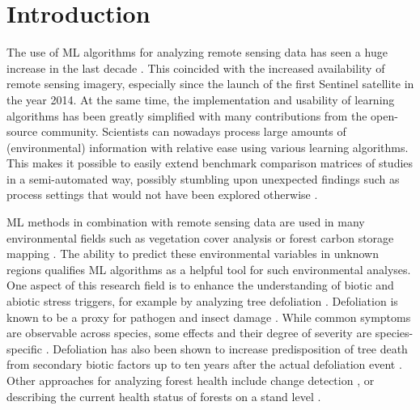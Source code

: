 \documentclass[remotesensing,article,submit,moreauthors,pdftex]{Definitions/mdpi}
\begin{document}
\section{Introduction}

The use of \ac{ML} algorithms for analyzing remote sensing data has seen a huge increase in the last decade \cite{lary2016}.
This coincided with the increased availability of remote sensing imagery, especially since the launch of the first Sentinel satellite in the year 2014.
At the same time, the implementation and usability of learning algorithms has been greatly simplified with many contributions from the open-source community.
Scientists can nowadays process large amounts of (environmental) information with relative ease using various learning algorithms.
This makes it possible to easily extend benchmark comparison matrices of studies in a semi-automated way, possibly stumbling upon unexpected findings such as process settings that would not have been explored otherwise \cite{ma2015}.


ML methods in combination with remote sensing data are used in many environmental fields such as vegetation cover analysis or forest carbon storage mapping \cite{mascaro2014, urban2018}.
The ability to predict these environmental variables in unknown regions qualifies ML algorithms as a helpful tool for such environmental analyses.
One aspect of this research field is to enhance the understanding of biotic and abiotic stress triggers, for example by analyzing tree defoliation \cite{hawrylo2018}.
Defoliation is known to be a proxy for pathogen and insect damage \cite{pollastrini2016}.
While common symptoms are observable across species, some effects and their degree of severity are species-specific \cite{gottardini2020}.
Defoliation has also been shown to increase predisposition of tree death from secondary biotic factors up to ten years after the actual defoliation event \cite{oliva2016}.
Other approaches for analyzing forest health include change detection \cite{zhang2016}, or describing the current health status of forests on a stand level \cite{townsend2012}.
\end{document}
